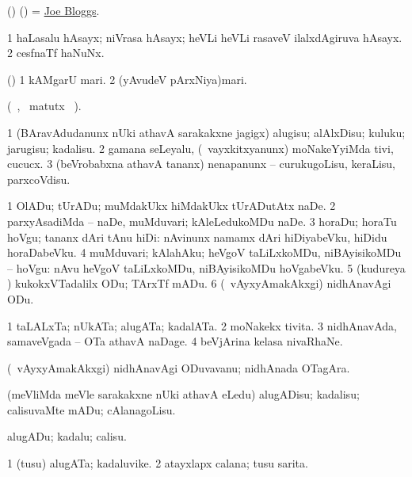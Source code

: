 \bentry
{}
\gl{\nA}
\bmng
(\ame) (\AmA)  = \hyperlink{Joe Bloggs}{Joe Bloggs}. 
\emng
\eentry

\bentry
{}
\gl{\nA}
\bmng
\bnum
\num{1} haLasalu hAsayx; niVrasa hAsayx; heVLi heVLi rasaveV ilalxdAgiruva hAsayx. 
\num{2} cesfnaTf haNuNx. 
\enum
\emng
\eentry

\bentry
{}
\gl{\nA}
\bmng
(\AseTxrXV) 
\bnum
\num{1} kAMgarU mari. 
\num{2} (yAvudeV pArxNiya)mari. 
\enum
\emng
\eentry

\bentry
{}
\gl{\kirx}
\bmng
(\vakaq\ , \BU\ matutx \BUkaq\ ). 
\emng

\noindent
\gl{\sakirx}
\bmng
\bnum
\num{1} (BAravAdudanunx nUki athavA sarakakxne jagigx) alugisu; alAlxDisu; kuluku; jarugisu; kadalisu. 
\num{2} gamana seLeyalu, (\kanmu\ vayxkitxyanunx) moNakeYyiMda tivi, cucucx. 
\num{3} (beVrobabxna athavA tananx) nenapanunx -- curukugoLisu, keraLisu, parxcoVdisu. 
\enum
\emng

\noindent
\gl{\akirx}
\bmng
\bnum
\num{1} OlADu; tUrADu; muMdakUkx hiMdakUkx tUrADutAtx naDe. 
\num{2} parxyAsadiMda -- naDe, muMduvari; kAleLedukoMDu naDe. 
\num{3} horaDu; horaTu hoVgu; tananx dAri tAnu hiDi:  nAvinunx namamx dAri hiDiyabeVku, hiDidu horaDabeVku. 
\num{4} muMduvari; kAlahAku; heVgoV taLiLxkoMDu, niBAyisikoMDu -- hoVgu:  nAvu heVgoV taLiLxkoMDu, niBAyisikoMDu hoVgabeVku. 
\num{5} (kudureya \vi) kukokxVTadalilx ODu; TArxTf mADu. 
\num{6} (\kanmu\ vAyxyAmakAkxgi) nidhAnavAgi ODu. 
\enum
\emng
\eentry

\bentry
{}
\gl{\nA}
\bmng
\bnum
\num{1} taLALxTa; nUkATa; alugATa; kadalATa. 
\num{2} moNakekx tivita. 
\num{3} nidhAnavAda, samaveVgada -- OTa athavA naDage. 
\num{4} beVjArina kelasa nivaRhaNe. 
\enum
\emng
\eentry

\bentry
{}
\gl{\nA}
\bmng
(\kanmu\ vAyxyAmakAkxgi) nidhAnavAgi ODuvavanu; nidhAnada OTagAra. 
\emng
\eentry

\bentry
{}
\gl{\sakirx}
\bmng
(meVliMda meVle sarakakxne nUki athavA eLedu) alugADisu; kadalisu; calisuvaMte mADu; cAlanagoLisu. 
\emng

\noindent
\gl{\akirx}
\bmng
alugADu; kadalu; calisu. 
\emng
\eentry

\bentry
{}
\gl{\nA}
\bmng
\bnum
\num{1} (tusu) alugATa; kadaluvike. 
\num{2} atayxlapx calana; tusu sarita. 
\enum
\emng
\eentry

